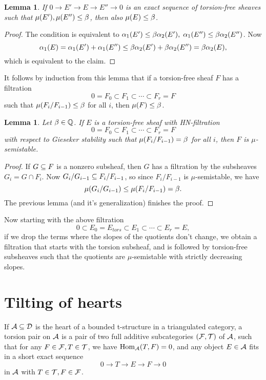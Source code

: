 \documentclass[letterpaper,10pt]{article}
\newtheorem{lem}[thm]{Lemma}
\begin{document}
\begin{lem}
    If $0 \to E' \to E \to E'' \to 0$ is an exact sequence of torsion-free sheaves such that $\mu(E'), \mu(E'') \le \beta$, then also $\mu(E) \le \beta$.
\end{lem}
\begin{proof}
    The condition is equivalent to $\alpha_1(E') \le \beta \alpha_2(E'), \; \alpha_1(E'') \le \beta \alpha_2(E'')$. Now
    \[ \alpha_1(E) = \alpha_1(E') + \alpha_1(E'') \le \beta \alpha_2(E') + \beta \alpha_2(E'') = \beta \alpha_2(E), \]
    which is equivalent to the claim.
\end{proof}

It follows by induction from this lemma that if a torsion-free sheaf $F$ has a filtration
\[ 0 = F_0 \subset F_1 \subset \cdots \subset F_r = F \]
such that $\mu(F_i/F_{i-1}) \le \beta$ for all $i$, then $\mu(F) \le \beta$.

\begin{lem}
    Let $\beta \in \mathbb{Q}$. If $E$ is a torsion-free sheaf with HN-filtration
    \[ 0 = F_0 \subset F_1 \subset \cdots \subset F_r = F \]
    with respect to Gieseker stability such that $\mu(F_i/F_{i-1}) = \beta$ for all $i$, then $F$ is $\mu$-semistable.
\end{lem}
\begin{proof}
    If $G \subseteq F$ is a nonzero subsheaf, then $G$ has a filtration by the subsheaves $G_i = G \cap F_i$. Now $G_i/G_{i-1} \subseteq F_i/F_{i-1}$, so since $F_i/F_{i-1}$ is $\mu$-semistable, we have
    \[ \mu(G_i/G_{i-1}) \le \mu(F_i/F_{i-1}) = \beta. \]
    The previous lemma (and it's generalization) finishes the proof.
\end{proof}

Now starting with the above filtration
\[ 0 \subset E_0 = E_{tors} \subset E_1 \subset \cdots \subset E_r = E, \]
if we drop the terms where the slopes of the quotients don't change, we obtain a filtration that starts with the torsion subsheaf, and is followed by torsion-free subsheaves such that the quotients are $\mu$-semistable with strictly decreasing slopes.


\section{Tilting of hearts}
If $\mathcal{A} \subseteq \mathcal{D}$ is the heart of a bounded t-structure in a triangulated category, a torsion pair on $\mathcal{A}$ is a pair of two full additive subcategories $(\mathcal{F}, \mathcal{T})$ of $\mathcal{A}$, such that for any $F \in \mathcal{F}, T \in \mathcal{T}$, we have $\mathrm{Hom}_{\mathcal{A}}(T, F) = 0$, and any object $E \in \mathcal{A}$ fits in a short exact sequence
\[ 0 \to T \to E \to F \to 0 \]
in $\mathcal{A}$ with $T \in \mathcal{T}, F \in \mathcal{F}$.
\end{document}

